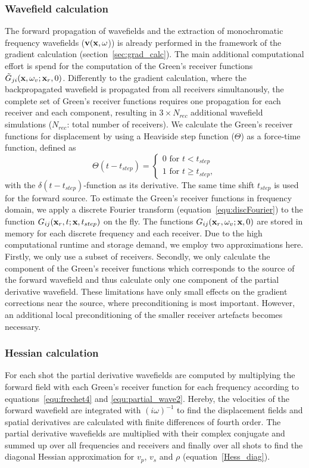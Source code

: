 \subsubsection*{Wavefield calculation}
The forward propagation of wavefields and the extraction of monochromatic frequency wavefields ($\textbf v(\textbf x,\omega$)) is already performed in the framework of the gradient calculation (section~\ref{sec:grad_calc}). The main additional computational effort is spend for the computation of the Green's receiver functions $\tilde G_{ji}(\textbf x,\omega_v;\textbf x_r,0)$. Differently to the gradient calculation, where the backpropagated wavefield is propagated from all receivers simultanously, the complete set of Green's receiver functions requires one propagation for each receiver and each component, resulting in $3\times N_{rec}$ additional wavefield simulations ($N_{rec}$: total number of receivers). We calculate the Green's receiver functions for displacement by using a Heaviside step function ($\Theta$) as a force-time function, defined as 
$$\Theta(t-t_{step})=
 \begin{cases}
  0 \mbox{ for } t<t_{step}\\
1\mbox{ for } t\geq t_{step},
 \end{cases}$$
with the $\delta(t-t_{step})$-function as its derivative. The same time shift $t_{step}$ is used for the forward source. To estimate the Green's receiver functions in frequency domain, we apply a discrete Fourier transform (equation~\ref{equ:discFourier}) to the function $G_{ij}(\textbf x_r,t;\textbf x,t_{step})$ on the fly. The functions $G_{ij}(\textbf x_r,\omega_v;\textbf x,0)$ are stored in memory for each discrete frequency and each receiver. Due to the high computational runtime and storage demand, we employ two approximations here. Firstly, we only use a subset of receivers. Secondly, we only calculate the component of the Green's receiver functions which corresponds to the source of the forward wavefield and thus calculate only one component of the partial derivative wavefield. These limitations have only small effects on the gradient corrections near the source, where preconditioning is most important. However, an additional local preconditioning of the smaller receiver artefacts becomes necessary. 
\subsubsection*{Hessian calculation}
For each shot the partial derivative wavefields are computed by multiplying the forward field with each Green's receiver function for each frequency according to equations~\ref{equ:frechet4} and \ref{equ:partial_wave2}. Hereby, the velocities of the forward wavefield are integrated with $(i\omega)^{-1}$ to find the displacement fields and spatial derivatives are calculated with finite differences of fourth order. The partial derivative wavefields are multiplied with their complex conjugate and summed up over all frequencies and receivers and finally over all shots to find the diagonal Hessian approximation for $v_p$, $v_s$ and $\rho$ (equation~\ref{Hess_diag}). 
